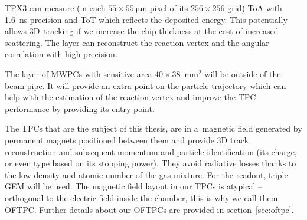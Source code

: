 		\ac{TPX3} can measure (in each $55\times55~\mathrm{\mu m}$ pixel of its $256\times256$ grid) \ac{ToA} with 1.6~ns precision and \ac{ToT} which reflects the deposited energy. This potentially allows 3D~tracking if we increase the chip thickness at the cost of increased scattering. The layer can reconstruct the reaction vertex and the angular correlation with high precision.
		
		The layer of \acp{MWPC} with sensitive area $40\times38$~mm$^2$ will be outside of the beam pipe. It will provide an extra point on the particle trajectory which can help with the estimation of the reaction vertex and improve the \ac{TPC} performance by providing its entry point.
		
		The \acp{TPC} that are the subject of this thesis, are in a~magnetic field generated by permanent magnets positioned between them and provide 3D track reconstruction and subsequent momentum and particle identification (its charge, or even type based on its stopping power). They avoid radiative losses thanks to the low density and atomic number of the gas mixture. For the readout, triple \ac{GEM} will be used. The magnetic field layout in our \acp{TPC} is atypical -- orthogonal to the electric field inside the chamber, this is why we call them \acf{OFTPC}. Further details about our \acp{OFTPC} are provided in section~\ref{sec:oftpc}.